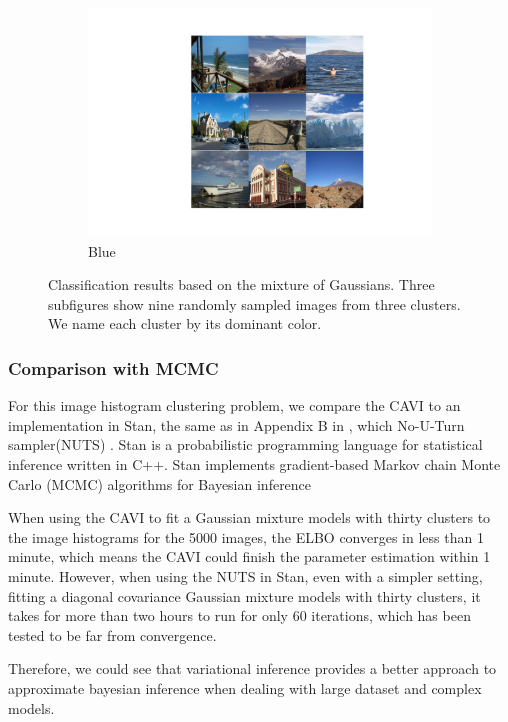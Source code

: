 \documentclass[letterpaper]{article}
\begin{document}
\begin{figure}[H]
\begin{subfigure}[b]{0.36\linewidth}
    \includegraphics[trim=5.5cm 5.5cm 5.5cm 5.5cm,clip=true,width=\linewidth]{outputs/report_figs/16.jpg}
    \caption{Blue}
  \end{subfigure}
  \caption{Classification results based on the mixture of Gaussians. Three subfigures show nine randomly sampled images from three clusters. We name each cluster by its dominant color.}
\label{fig:hist2}
\end{figure}

\subsubsection{Comparison with MCMC}

For this image histogram clustering problem, we compare the CAVI to an implementation in Stan, the same as in Appendix B in \citep{blei2017variational}, which No-U-Turn sampler(NUTS)\citep{carpenter2017stan} \citep{hoffman2012stan}. Stan is a probabilistic programming language for statistical inference written in C++. Stan implements gradient-based Markov chain Monte Carlo (MCMC) algorithms for Bayesian inference

When using the CAVI to fit a Gaussian mixture models with thirty clusters to the image histograms for the 5000 images, the ELBO converges in less than 1 minute, which means the CAVI could finish the parameter estimation within 1 minute. However, when using the NUTS in Stan, even with a simpler setting, fitting a diagonal covariance Gaussian mixture models with thirty clusters, it takes for more than two hours to run for only 60 iterations, which has been tested to be far from convergence.

Therefore, we could see that variational inference provides a better approach to approximate bayesian inference when dealing with large dataset and complex models.
\end{document}
